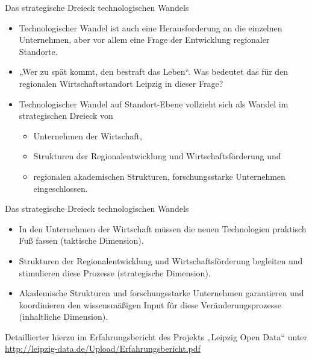 \documentclass{beamer}
\begin{document}
\begin{frame}{Das strategische Dreieck technologischen Wandels}{}
  \begin{itemize}
  \item Technologischer Wandel ist auch eine Herausforderung an die einzelnen
    Unternehmen, aber vor allem eine Frage der Entwicklung regionaler
    Standorte.
  \item „Wer zu spät kommt, den bestraft das Leben“. Was bedeutet das für den
    regionalen Wirtschaftsstandort Leipzig in dieser Frage?
  \item Technologischer Wandel auf Standort-Ebene vollzieht sich als Wandel im
    strategischen Dreieck von
    \begin{itemize}
    \item Unternehmen der Wirtschaft,
    \item Strukturen der Regionalentwicklung und Wirtschaftsförderung und
    \item regionalen akademischen Strukturen, forschungsstarke Unternehmen
      eingeschlossen.
    \end{itemize}
  \end{itemize}
\end{frame}

\begin{frame}{Das strategische Dreieck technologischen Wandels}{}
  \begin{itemize}
  \item In den Unternehmen der Wirtschaft müssen die neuen Technologien
    praktisch Fuß fassen (taktische Dimension).
  \item Strukturen der Regionalentwicklung und Wirtschaftsförderung begleiten
    und stimulieren diese Prozesse (strategische Dimension).
  \item Akademische Strukturen und forschungsstarke Unternehmen garantieren und
    koordinieren den wissensmäßigen Input für diese Veränderungsprozesse
    (inhaltliche Dimension).
  \end{itemize}
Detaillierter hierzu im Erfahrungsbericht des Projekts „Leipzig Open Data“
unter \url{http://leipzig-data.de/Upload/Erfahrungsbericht.pdf}
\end{frame}
\end{document}
